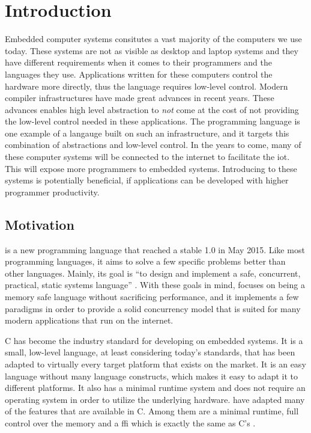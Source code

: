 
\chapter{Introduction}
\label{chap:intro}

Embedded computer systems consitutes a vast majority of the computers we use today.
These systems are not as visible as desktop and laptop systems and they have different requirements when it comes to their programmers and the languages they use.
Applications written for these computers control the hardware more directly, thus the language requires low-level control.
Modern compiler infrastructures have made great advances in recent years.
These advances enables high level abstraction to \emph{not} come at the cost of not providing the low-level control needed in these applications.
The {\rust} programming language is one example of a langauge built on such an infrastructure, and it targets this combination of abstractions and low-level control.
In the years to come, many of these computer systems will be connected to the internet to facilitate the \glsdesc{iot}.
This will expose more programmers to embedded systems.
Introducing {\rust} to these systems is potentially beneficial, if applications can be developed with higher programmer productivity.


\section{Motivation} %
\label{sec:intro:rust_as_replacement_to_c}

{\rust} is a new programming language that reached a stable 1.0 in May 2015.
Like most programming languages, it aims to solve a few specific problems better than other languages.
Mainly, its goal is ``to design and implement a safe, concurrent, practical, static systems language'' \cite{web:rust_faq}.
With these goals in mind, {\rust} focuses on being a memory safe language without sacrificing performance, and it implements a few paradigms in order to provide a solid concurrency model that is suited for many modern applications that run on the internet.

C has become the industry standard for developing on embedded systems.
It is a small, low-level language, at least considering today's standards, that has been adapted to virtually every target platform that exists on the market.
It is an easy language without many language constructs, which makes it easy to adapt it to different platforms.
It also has a minimal runtime system and does not require an operating system in order to utilize the underlying hardware.
{\rust} have adapted many of the features that are available in C.
Among them are a minimal runtime, full control over the memory and a \gls{ffi} which is exactly the same as C's \cite{web:rust_once_run_everywhere}.

